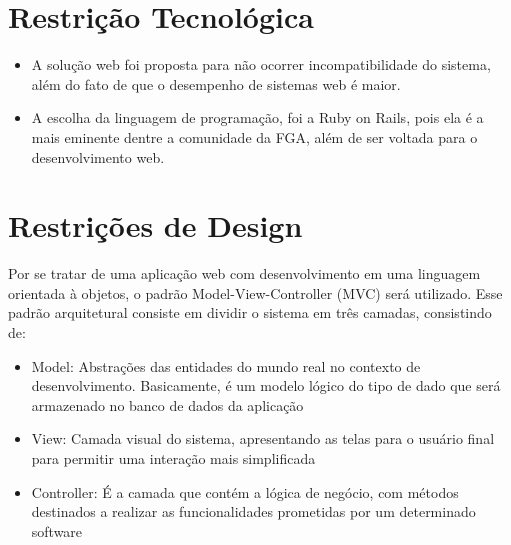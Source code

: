 \section{Restrição Tecnológica}

\begin{itemize}
\item{A solução web foi proposta para não ocorrer incompatibilidade do sistema, além do fato de que o desempenho de sistemas web é maior.}
\item{A escolha da linguagem de programação, foi a Ruby on Rails, pois ela é a mais eminente dentre a comunidade da FGA, além de ser voltada para o desenvolvimento web.}
\end{itemize}

\section{Restrições de Design}

Por se tratar de uma aplicação web com desenvolvimento em uma linguagem orientada à objetos, o padrão Model-View-Controller (MVC) será utilizado. Esse padrão arquitetural consiste em dividir o sistema em três camadas, consistindo de:

\begin{itemize}
\item{Model: Abstrações das entidades do mundo real no contexto de desenvolvimento. Basicamente, é um modelo lógico do tipo de dado que será armazenado no banco de dados da aplicação}
\item{View: Camada visual do sistema, apresentando as telas para o usuário final para permitir uma interação mais simplificada}
\item{Controller: É a camada que contém a lógica de negócio, com métodos destinados a realizar as funcionalidades prometidas por um determinado software}
\end{itemize}


